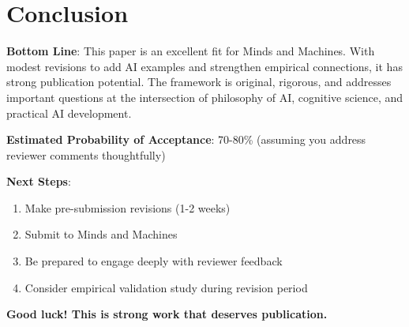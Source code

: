 \documentclass[12pt]{article}
\begin{document}
\section{Conclusion}

\textbf{Bottom Line}: This paper is an excellent fit for Minds and Machines. With modest revisions to add AI examples and strengthen empirical connections, it has strong publication potential. The framework is original, rigorous, and addresses important questions at the intersection of philosophy of AI, cognitive science, and practical AI development.

\textbf{Estimated Probability of Acceptance}: 70-80\% (assuming you address reviewer comments thoughtfully)

\textbf{Next Steps}:
\begin{enumerate}
\item Make pre-submission revisions (1-2 weeks)
\item Submit to Minds and Machines
\item Be prepared to engage deeply with reviewer feedback
\item Consider empirical validation study during revision period
\end{enumerate}

\vspace{1em}

\noindent\textbf{Good luck! This is strong work that deserves publication.}
\end{document}
